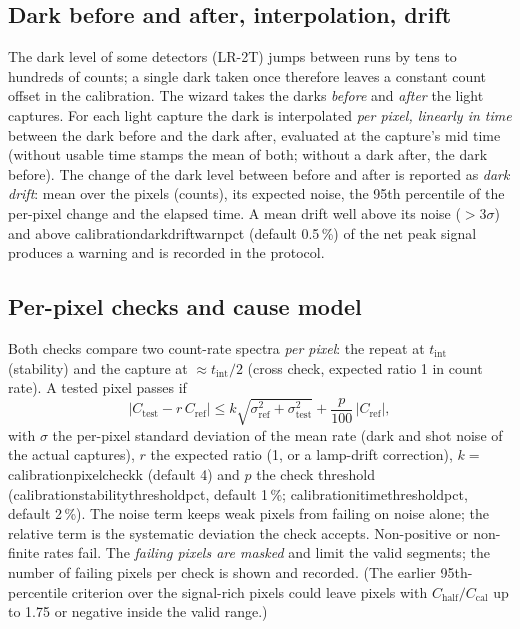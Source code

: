 \documentclass[12pt,a4paper]{article}
\DeclareRobustCommand{\key}[1]{{\ttfamily\small\color{acc2}\def\_{\rawus\allowbreak}#1}}
\begin{document}
\subsection{Dark before and after, interpolation, drift}\label{sec:speccal-dark}
The dark level of some detectors (LR-2T) jumps between runs by tens to hundreds
of counts; a single dark taken once therefore leaves a constant count offset in
the calibration. The wizard takes the darks \emph{before} and \emph{after} the
light captures. For each light capture the dark is interpolated \emph{per pixel,
linearly in time} between the dark before and the dark after, evaluated at the
capture's mid time (without usable time stamps the mean of both; without a dark
after, the dark before). The change of the dark level between before and after
is reported as \emph{dark drift}: mean over the pixels (counts), its expected
noise, the 95th percentile of the per-pixel change and the elapsed time. A mean
drift well above its noise ($>3\sigma$) and above
\key{calibration\_dark\_drift\_warn\_pct} (default 0.5\,\%) of the net peak signal
produces a warning and is recorded in the protocol.

\subsection{Per-pixel checks and cause model}\label{sec:speccal-checks}
Both checks compare two count-rate spectra \emph{per pixel}: the repeat at
$t_{\mathrm{int}}$ (stability) and the capture at $\approx t_{\mathrm{int}}/2$
(cross check, expected ratio 1 in count rate). A tested pixel passes if
\[
  \bigl|C_{\mathrm{test}} - r\,C_{\mathrm{ref}}\bigr| \le
  k\sqrt{\sigma_{\mathrm{ref}}^{2}+\sigma_{\mathrm{test}}^{2}}
  + \frac{p}{100}\,|C_{\mathrm{ref}}| ,
\]
with $\sigma$ the per-pixel standard deviation of the mean rate (dark and shot
noise of the actual captures), $r$ the expected ratio (1, or a lamp-drift
correction), $k=$ \key{calibration\_pixel\_check\_k} (default 4) and $p$ the
check threshold (\key{calibration\_stability\_threshold\_pct}, default 1\,\%;
\key{calibration\_itime\_threshold\_pct}, default 2\,\%). The noise term keeps
weak pixels from failing on noise alone; the relative term is the systematic
deviation the check accepts. Non-positive or non-finite rates fail. The
\emph{failing pixels are masked} and limit the valid segments; the number of
failing pixels per check is shown and recorded. (The earlier 95th-percentile
criterion over the signal-rich pixels could leave pixels with
$C_{\mathrm{half}}/C_{\mathrm{cal}}$ up to 1.75 or negative inside the valid
range.)
\end{document}

